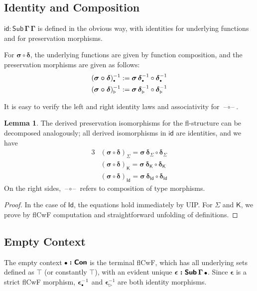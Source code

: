 \documentclass{article}
\theoremstyle{definition}
\theoremstyle{theorem}
\newtheorem{lemma}{Lemma}
\newcommand{\id}{\mathsf{id}}
\newcommand{\Con}{\mathsf{Con}}
\newcommand{\Sub}{\mathsf{Sub}}
\newcommand{\Id}{\mathsf{Id}}
\newcommand{\blank}{\mathord{\hspace{1pt}\text{--}\hspace{1pt}}}
\newcommand{\ext}{\triangleright}
\newcommand{\emptycon}{\scaleobj{.75}\bullet}
\newcommand{\K}{\mathsf{K}}
\newcommand{\bSub}{\boldsymbol{\Sub}}
\newcommand{\bGamma}{\boldsymbol{\Gamma}}
\newcommand{\bsigma}{\boldsymbol{\sigma}}
\newcommand{\bdelta}{\boldsymbol{\delta}}
\newcommand{\bepsilon}{\boldsymbol{\epsilon}}
\newcommand{\bid}{\boldsymbol{\id}}
\begin{document}
\subsection{Identity and Composition}
\label{sec:idcomp}

$\bid : \bSub\,\bGamma\,\bGamma$ is defined in the obvious way, with identities for
underlying functions and for preservation morphisms.

For $\boldsymbol{\sigma \circ \delta}$, the underlying functions are given by
function composition, and the preservation morphisms are given as follows:
\begin{alignat*}{3}
  & (\boldsymbol{\sigma \circ \delta})_{\emptycon}^{-1} :=
    \bsigma\,\bdelta_{\emptycon}^{-1} \circ \bdelta_{\emptycon}^{-1} \\
  & (\boldsymbol{\sigma \circ \delta})_{\ext}^{-1} :=
    \bsigma\,\bdelta_{\ext}^{-1} \circ \bdelta_{\ext}^{-1}
\end{alignat*}

It is easy to verify the left and right identity laws and associativity for
$\boldsymbol{\blank\circ\blank}$.

\begin{lemma}\label{lem:idcomppres}
The derived preservation isomorphisms for the fl-structure can be decomposed
analogously; all derived isomorphisms in $\bid$ are identities, and we have
\begin{alignat*}{3}
  & (\boldsymbol{\sigma \circ \delta})_{\Sigma} =
  \bsigma\,\bdelta_{\Sigma} \circ \bdelta_{\Sigma}\\
  & (\boldsymbol{\sigma \circ \delta})_{\K} =
  \bsigma\,\bdelta_{\K} \circ \bdelta_{\K}\\
  & (\boldsymbol{\sigma \circ \delta})_{\Id} =
  \bsigma\,\bdelta_{\Id} \circ \bdelta_{\Id}
\end{alignat*}
On the right sides, $\blank\circ\blank$ refers to composition of type morphisms.
\end{lemma}
\begin{proof}
In the case of $\Id$, the equations hold immediately by UIP. For $\Sigma$ and
$\K$, we prove by flCwF computation and straightforward unfolding of
definitions.
\end{proof}

\subsection{Empty Context}
The empty context $\boldsymbol{\emptycon : \Con}$ is the terminal flCwF, which
has all underlying sets defined as $\top$ (or constantly $\top$), with an
evident unique $\boldsymbol{\epsilon : \Sub\,\Gamma\,\emptycon}$. Since
$\bepsilon$ is a strict flCwF morphism, $\bepsilon_{\emptycon}^{-1}$ and
$\bepsilon_{\ext}^{-1}$ are both identity morphisms.
\end{document}
